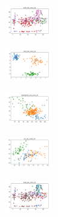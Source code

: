 \begin{figure}[H]
\begin{subfigure}
    \end{subfigure}
    \hfill
    \begin{subfigure}
        \centering
        \includegraphics[width=0.234\textwidth]{img/am01/ecoli_set_const_20_589741062_clust.png}
    \end{subfigure}
    \hfill
    \begin{subfigure}
        \centering
        \includegraphics[width=0.234\textwidth]{img/am01/rand_set_const_20_589741062_clust.png}
    \end{subfigure}
    \hfill
    \begin{subfigure}
        \centering
        \includegraphics[width=0.234\textwidth]{img/am01/newthyroid_set_const_20_589741062_clust.png}
    \end{subfigure}
    \hfill
    \begin{subfigure}
        \centering
        \includegraphics[width=0.234\textwidth]{img/am01/iris_set_const_20_277451237_clust.png}
    \end{subfigure}
    \hfill
    \begin{subfigure}
        \centering
        \includegraphics[width=0.234\textwidth]{img/am01/ecoli_set_const_20_277451237_clust.png}
    \end{subfigure}
    \hfill

\end{figure}
